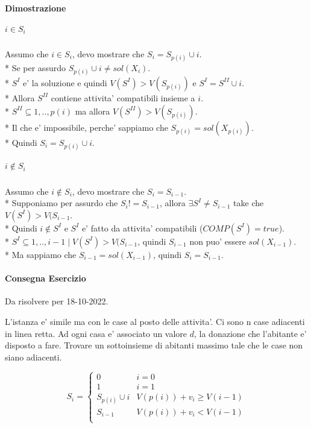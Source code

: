\paragraph{Dimostrazione}

\subparagraph{$i \in S_i$}
Assumo che $i \in S_i$, devo mostrare che $S_i = S_{p(i)} \cup {i}$. \\*
Se per assurdo $S_{p(i)} \cup {i} \ne sol(X_i)$. \\*
$S^I$ e' la soluzione e quindi $V(S^I) > V(S_{p(i)})$ e $S^I = S^{II} \cup {i}$. \\*
Allora $S^{II}$ contiene attivita' compatibili insieme a $i$. \\*
$S^{II} \subseteq {1,..,p(i)}$ ma allora $V(S^{II}) > V(S_{p(i)})$. \\*
Il che e' impossibile, perche' sappiamo che $S_{p(i)} = sol(X_{p(i)})$. \\*
Quindi $S_i = S_{p(i)} \cup {i}$.

\subparagraph{$i \notin S_i$}

Assumo che $i \notin S_i$, devo mostrare che $S_i = S_{i-1}$. \\*
Supponiamo per assurdo che $S_i != S_{i-1}$, allora $\exists S^I \ne S_{i-1}$ take che $V(S^I) > V(S_{i-1}$. \\*
Quindi $i \notin S^I$ e $S^I$ e' fatto da attivita' compatibili ($COMP(S^I) = true$). \\*
$S^I \subseteq {1,..,i-1} \mid V(S^I) > V(S_{i-1}$, quindi $S_{i-1}$ non puo' essere $sol(X_{i-1})$. \\*
Ma sappiamo che $S_{i-1} = sol(X_{i-1})$, quindi $S_i = S_{i-1}$.

\paragraph{Consegna Esercizio}
Da risolvere per 18-10-2022.

L'istanza e' simile ma con le case al posto delle attivita'.
Ci sono n case adiacenti in linea retta.
Ad ogni casa e' associato un valore $d$, la donazione che l'abitante e' disposto a fare.
Trovare un sottoinsieme di abitanti massimo tale che le case non siano adiacenti.

\[
    S_i =
    \begin{cases}
        \text{$0$} & \text{$i = 0$} \\
        \text{$1$} & \text{$i = 1$} \\
        \text{$S_{p(i)} \cup {i}$} & \text{$V(p(i)) + v_i \geq V(i-1)$} \\
        \text{$S_{i-1}$} & \text{$V(p(i)) + v_i < V(i-1)$} \\
    \end{cases}
\]

